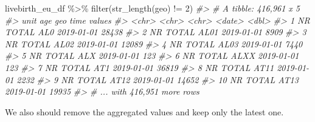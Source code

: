 \documentclass[
]{article}
\newenvironment{Shaded}{\begin{snugshade}}{\end{snugshade}}
\newcommand{\CommentTok}[1]{\textcolor[rgb]{0.56,0.35,0.01}{\textit{#1}}}
\newcommand{\DecValTok}[1]{\textcolor[rgb]{0.00,0.00,0.81}{#1}}
\newcommand{\FunctionTok}[1]{\textcolor[rgb]{0.00,0.00,0.00}{#1}}
\newcommand{\NormalTok}[1]{#1}
\newcommand{\SpecialCharTok}[1]{\textcolor[rgb]{0.00,0.00,0.00}{#1}}
\begin{document}
\begin{Shaded}
\begin{Highlighting}[]
\NormalTok{livebirth\_eu\_df }\SpecialCharTok{\%\textgreater{}\%} 
  \FunctionTok{filter}\NormalTok{(}\FunctionTok{str\_length}\NormalTok{(geo) }\SpecialCharTok{!=} \DecValTok{2}\NormalTok{)}
\CommentTok{\#\textgreater{} \# A tibble: 416,961 x 5}
\CommentTok{\#\textgreater{}    unit  age   geo   time       values}
\CommentTok{\#\textgreater{}    \textless{}chr\textgreater{} \textless{}chr\textgreater{} \textless{}chr\textgreater{} \textless{}date\textgreater{}      \textless{}dbl\textgreater{}}
\CommentTok{\#\textgreater{}  1 NR    TOTAL AL0   2019{-}01{-}01  28438}
\CommentTok{\#\textgreater{}  2 NR    TOTAL AL01  2019{-}01{-}01   8909}
\CommentTok{\#\textgreater{}  3 NR    TOTAL AL02  2019{-}01{-}01  12089}
\CommentTok{\#\textgreater{}  4 NR    TOTAL AL03  2019{-}01{-}01   7440}
\CommentTok{\#\textgreater{}  5 NR    TOTAL ALX   2019{-}01{-}01    123}
\CommentTok{\#\textgreater{}  6 NR    TOTAL ALXX  2019{-}01{-}01    123}
\CommentTok{\#\textgreater{}  7 NR    TOTAL AT1   2019{-}01{-}01  36819}
\CommentTok{\#\textgreater{}  8 NR    TOTAL AT11  2019{-}01{-}01   2232}
\CommentTok{\#\textgreater{}  9 NR    TOTAL AT12  2019{-}01{-}01  14652}
\CommentTok{\#\textgreater{} 10 NR    TOTAL AT13  2019{-}01{-}01  19935}
\CommentTok{\#\textgreater{} \# ... with 416,951 more rows}
\end{Highlighting}
\end{Shaded}

We also should remove the aggregated values and keep only the latest one.
\end{document}
